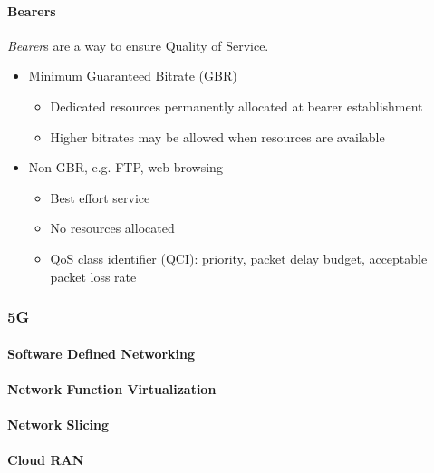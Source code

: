 \paragraph{Bearers}\label{par:Bearers}
\begin{definition}[Bearer]\label{def:Bearer}
  \emph{Bearer}s are a way to ensure Quality of Service.

  \begin{itemize}[noitemsep]
  \item Minimum Guaranteed Bitrate (GBR)
    \begin{itemize}[noitemsep]
    \item Dedicated resources permanently allocated at bearer establishment
    \item Higher bitrates may be allowed when resources are available
    \end{itemize}

  \item Non-GBR, e.g. FTP, web browsing
    \begin{itemize}[noitemsep]
    \item Best effort service
    \item No resources allocated
    \item QoS class identifier (QCI): priority, packet delay budget, acceptable packet loss rate
    \end{itemize}
  \end{itemize}
\end{definition}

\subsubsection{5G}\label{subsubsec:5G}
\paragraph{Software Defined Networking}\label{par:SDN}
\paragraph{Network Function Virtualization}\label{par:NFV}
\paragraph{Network Slicing}\label{par:Network_Slicing}
\paragraph{Cloud RAN}\label{par:Cloud_RAN}
